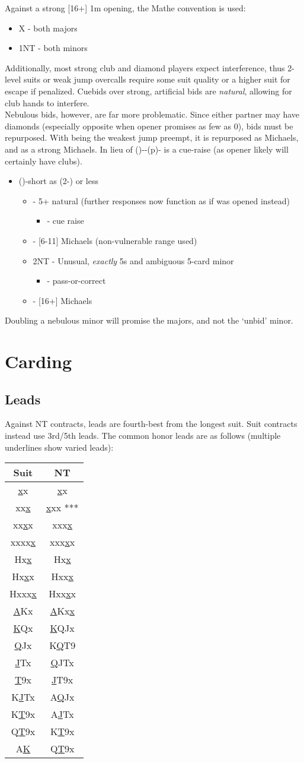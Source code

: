 \documentclass[12pt]{report}
\newcommand{\n}{\\}
\newcommand{\q}[1]{\multido{}{#1}{\qquad}}
\newcommand{\ul}[1]{\begin{itemize}#1\end{itemize}}
\newcommand{\li}[1]{\item[~] \q{#1}}
\begin{document}
    Against a strong [16+] 1m opening, the Mathe convention is used:

    \ul {
        \li0 X - both majors
        \li0 1NT - both minors
    }

    Additionally, most strong club and diamond players expect interference, thus 2-level suits or weak jump overcalls require some suit quality or a higher suit for escape if penalized.  Cuebids over strong, artificial bids are \textit{natural}, allowing for club hands to interfere.\n

    Nebulous bids, however, are far more problematic.  Since either partner may have diamonds (especially opposite when opener promises as few as 0), bids must be repurposed.  With  being the weakest jump preempt, it is repurposed as Michaels, and  as a strong Michaels.  In lieu of ()--(p)- is a cue-raise (as opener likely will certainly have clubs).
    
    \ul {
        \li0 ()-short as (2-) or less
        \ul {
            \li0 \di2 - 5+ natural (further responses now function as if \cl1 was opened instead)
            \ul {
                \li0 \cl3 - cue raise
            }
            \li0 \he2 - [6-11] Michaels (non-vulnerable range used)
            \li0 2NT - Unusual, \textit{exactly} 5\he{}s and ambiguous 5-card minor
            \ul {
                \li0 \cl3 - pass-or-correct
            }
            \li0 \di3 - [16+] Michaels
        }
    }

    Doubling a nebulous minor will promise the majors, and not the `unbid' minor.

\chapter{Carding} \label{5}

\section{Leads}

    Against NT contracts, leads are fourth-best from the longest suit.  Suit contracts instead use 3rd/5th leads. The common honor leads are as follows (multiple underlines show varied leads):

    \newcommand{\uu}[1]{\underline{#1}}
    \begin{center}
        \begin{tabular}{ |c|c| } 
            \hline
            Suit & NT \n
            \hline
            \uu{x}x & \uu{x}x\n
            xx\uu{x} & \uu{x}xx ***\n
            xx\uu{x}x & xxx\uu{x}\n
            xxxx\uu{x} & xxx\uu{x}x\n
            Hx\uu{x} & Hx\uu{x}\n
            Hx\uu{x}x & Hxx\uu{x}\n
            Hxxx\uu{x} & Hxx\uu{x}x\n
            \uu{A}Kx & \uu{A}Kx\uu{x}\n
            \uu{K}Qx & \uu{K}QJx\n
            \uu{Q}Jx & K\uu{Q}T9\n
            \uu{J}Tx & \uu{Q}JTx\n
            \uu{T}9x & \uu{J}T9x\n
            K\uu{J}Tx & A\uu{Q}Jx\n
            K\uu{T}9x & A\uu{J}Tx\n
            Q\uu{T}9x & K\uu{T}9x\n
            A\uu{K} & Q\uu{T}9x\n
            \hline
        \end{tabular}
    \end{center}
\end{document}
